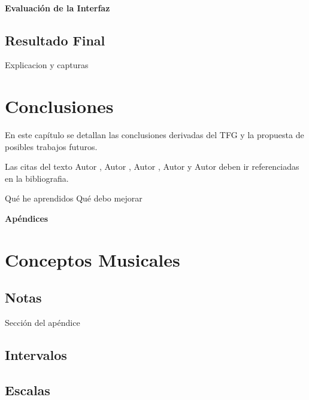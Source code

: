 \documentclass[12pt,twoside,titlepage]{report}
\newcommand\blankpage{%
    \newpage
    \null
    \thispagestyle{empty}%
    \newpage}
\begin{document}
\subsubsection{Evaluación de la Interfaz}

\section{Resultado Final}

Explicacion y capturas

\newpage

\chapter{Conclusiones}

En este capítulo se detallan las conclusiones derivadas del TFG y la propuesta de posibles trabajos futuros.

Las citas del texto Autor \cite{giaquinta}, Autor \cite{fortune}, Autor \cite{fortuneB}, Autor \cite{mitchell} y Autor \cite{morrey} deben ir referenciadas en la bibliografia.


Qué he aprendidos
Qué debo mejorar

\blankpage




{}
\footnotesize{
%


}
\raggedbottom
\afterpage{\blankpage}
\newpage



\appendix
{}
{}
\mbox{}
\vfill
\begin{center}
\begin{Huge}
\textbf{Apéndices}
\end{Huge}
\end{center}
\vfill
\mbox{}
\thispagestyle{empty}
\newpage
\mbox{}
\thispagestyle{empty}
\newpage

\chapter{Conceptos Musicales}
\label{sec:apendice}

\section{Notas}

Sección del apéndice

\section{Intervalos}
\section{Escalas}






\end{document}
